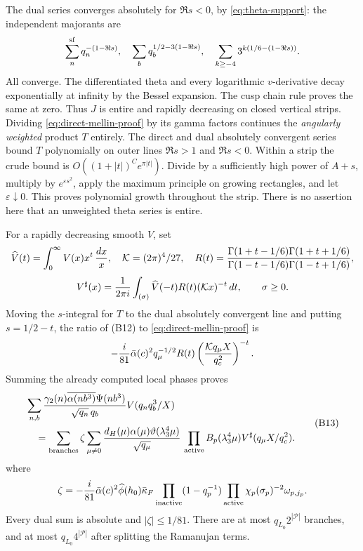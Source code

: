 \documentclass[12pt]{article}
\begin{document}
The dual series converges absolutely for \(\Re s<0\), by
\eqref{eq:theta-support}: the independent majorants are
\[
 \sum_n^{\rm sf}q_n^{-(1-\Re s)},\quad
 \sum_b q_b^{1/2-3(1-\Re s)},\quad
 \sum_{k\ge-4}3^{k(1/6-(1-\Re s))}.
\]
All converge.  The differentiated theta and every logarithmic
\(v\)-derivative decay exponentially at infinity by the Bessel
expansion.  The cusp chain rule proves the same at zero.
Thus \(J\) is entire and rapidly decreasing on closed vertical
strips.  Dividing \eqref{eq:direct-mellin-proof} by its gamma
factors continues the \emph{angularly weighted} product \(T\)
entirely.  The direct and dual absolutely convergent series
bound \(T\) polynomially on outer lines \(\Re s>1\) and \(\Re s<0\).
Within a strip the crude bound is
\(O((1+|t|)^C e^{\pi|t|})\).
Divide by a sufficiently high power of \(A+s\), multiply by
\(e^{\varepsilon s^2}\), apply the maximum principle on growing
rectangles, and let \(\varepsilon\downarrow0\).
This proves polynomial growth throughout the strip.
There is no assertion here that an unweighted theta series is entire.

For a rapidly decreasing smooth \(V\), set
\[
 \widehat V(t)=\int_0^\infty V(x)x^t\,\frac{dx}{x},\quad
 {\cal K}=(2\pi)^4/27,\quad
 R(t)=\frac{\Gamma(1+t-1/6)\Gamma(1+t+1/6)}
            {\Gamma(1-t-1/6)\Gamma(1-t+1/6)},
\]
\[
 V^\sharp(x)=\frac1{2\pi i}
                  \int_{(\sigma)}\widehat V(-t)R(t)({\cal K}x)^{-t}\,dt,
 \qquad \sigma\ge0 .
\]
Moving the \(s\)-integral for \(T\) to the dual absolutely
convergent line and putting \(s=1/2-t\), the ratio of (B12)
to \eqref{eq:direct-mellin-proof} is
\[
 -\frac i{81}\bar\alpha(c)^2q_\mu^{-1/2}
 R(t)\left(\frac{{\cal K}q_\mu X}{q_c^2}\right)^{-t}.
\]
Summing the already computed local phases proves
\[
 \begin{aligned}
 &\sum_{n,b}\frac{\gamma_2(n)\overline{\alpha(nb^3)}\Psi(nb^3)}
                   {\sqrt{q_n}\,q_b}V(q_nq_b^3/X)\\
 &\quad=\sum_{\rm branches}\zeta
       \sum_{\mu\ne0}\frac{d_H(\mu)\alpha(\mu)
                         \vartheta(\lambda_3^4\mu)}{\sqrt{q_\mu}}\,
       \prod_{\rm active}B_p(\lambda_3^4\mu)
                         V^\sharp(q_\mu X/q_c^2).
 \end{aligned}
 \tag{B13}\label{eq:complete-reflection-proof}
\]
where
\[
 \zeta=-\frac i{81}\bar\alpha(c)^2\widehat\phi(h_0)\bar\kappa_F
           \prod_{\rm inactive}(1-q_p^{-1})
           \prod_{\rm active}\chi_p(\sigma_p)^{-2}\omega_{p,j_p}.
\]
Every dual sum is absolute and \(|\zeta|\le1/81\).
There are at most \(q_{L_0}2^{|\mathcal P|}\) branches, and at
most \(q_{L_0}4^{|\mathcal P|}\) after splitting the Ramanujan
terms.
\end{document}

